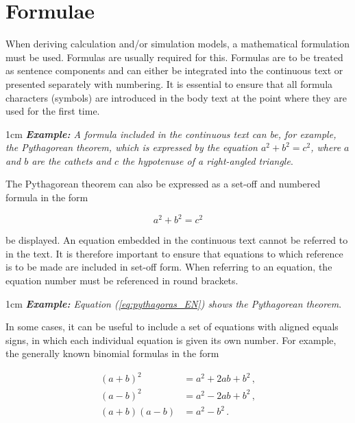 \chapter{Formulae}
\label{cha:Formulae}

When deriving calculation and/or simulation models, a mathematical formulation must be used. Formulas are usually required for this. Formulas are to be treated as sentence components and can either be integrated into the continuous text or presented separately with numbering. It is essential to ensure that all formula characters (symbols) are introduced in the body text at the point where they are used for the first time.




\begin{addmargin}[1cm]{1cm}
	\textit{\textbf{Example:} A formula included in the continuous text can be, for example, the Pythagorean theorem, which is expressed by the equation $a^2+b^2=c^2$, where $a$ and $b$ are the cathets and $c$ the hypotenuse of a right-angled triangle}.
\end{addmargin}

The Pythagorean theorem can also be expressed as a set-off and numbered formula in the form

\begin{equation}
	a^2+b^2=c^2
	\label{eq:pythagoras_EN}
\end{equation}


be displayed. An equation embedded in the continuous text cannot be referred to in the text. It is therefore important to ensure that equations to which reference is to be made are included in set-off form. When referring to an equation, the equation number must be referenced in round brackets. 


\begin{addmargin}[1cm]{1cm}
	\textit{\textbf{Example:} Equation (\ref{eq:pythagoras_EN}) shows the Pythagorean theorem}.
\end{addmargin}

In some cases, it can be useful to include a set of equations with aligned equals signs, in which each individual equation is given its own number. For example, the generally known binomial formulas in the form

\begin{align}
	(a+b)^2 & = a^2 + 2ab + b^2 \, , \label{eq:bin-1_EN} \\
	(a-b)^2 & = a^2 - 2ab + b^2 \, , \label{eq:bin-2_EN} \\
	(a+b)(a-b) & = a^2 - b^2 \, . \label{eq:bin-3_EN} 
\end{align}


